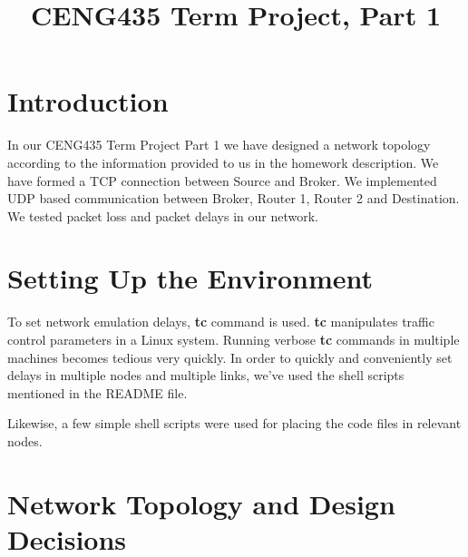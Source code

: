 \documentclass[conference]{IEEEtran}
\begin{document}
\title{CENG435 Term Project, Part 1\\
}

\author{
\IEEEauthorblockA{
}
\and
{}
\IEEEauthorblockA{
}
}

\maketitle

\section{Introduction}

In our CENG435 Term Project Part 1 we have designed a network topology according to the information provided to us in the homework description. We have formed a TCP connection between Source and Broker. We implemented UDP based communication between Broker, Router 1, Router 2 and Destination. We tested packet loss and packet delays in our network.

\section{Setting Up the Environment}
To set network emulation delays, \textbf{tc} command is used. \textbf{tc} manipulates
traffic control parameters in a Linux system. Running verbose \textbf{tc} commands
in multiple machines becomes tedious very quickly.
In order to quickly and conveniently set delays in multiple nodes and multiple links,
we've used the shell scripts mentioned in the README file.

Likewise, a few simple shell scripts were used for placing the code files in relevant nodes.

\section{Network Topology and Design Decisions}
\end{document}
